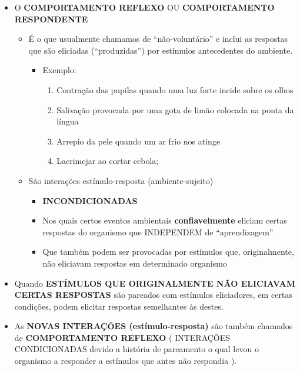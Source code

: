 \documentclass[
]{book}
\providecommand{\tightlist}{%
  \setlength{\itemsep}{0pt}\setlength{\parskip}{0pt}}
\begin{document}
\begin{itemize}
\tightlist
\item
  O \textbf{COMPORTAMENTO REFLEXO} OU \textbf{COMPORTAMENTO RESPONDENTE}

  \begin{itemize}
  \tightlist
  \item
    É o que usualmente chamamos de ``não-voluntário'' e inclui as
    respostas que são eliciadas (``produzidas'') por estímulos
    antecedentes do ambiente.

    \begin{itemize}
    \tightlist
    \item
      Exemplo:

      \begin{enumerate}
      \def\labelenumi{\alph{enumi}.}
      \tightlist
      \item
        Contração das pupilas quando uma luz forte incide sobre os olhos
      \item
        Salivação provocada por uma gota de limão colocada na ponta da
        língua
      \item
        Arrepio da pele quando um ar frio nos atinge
      \item
        Lacrimejar ao cortar cebola;
      \end{enumerate}
    \end{itemize}
  \item
    São interações estímulo-resposta (ambiente-sujeito)

    \begin{itemize}
    \tightlist
    \item
      \textbf{INCONDICIONADAS}
    \item
      Nos quais certos eventos ambientais \textbf{confiavelmente}
      eliciam certas respostas do organismo que INDEPENDEM de
      ``aprendizagem''
    \item
      Que também podem ser provocadas por estímulos que, originalmente,
      não eliciavam respostas em determinado organismo
    \end{itemize}
  \end{itemize}
\item
  Quando \textbf{ESTÍMULOS QUE ORIGINALMENTE NÃO ELICIAVAM CERTAS
  RESPOSTAS} são pareados com estímulos eliciadores, em certas
  condições, podem elicitar respostas semelhantes às destes.
\item
  As \textbf{NOVAS INTERAÇÕES (estímulo-resposta)} são também chamados
  de \textbf{COMPORTAMENTO REFLEXO} ( INTERAÇÕES CONDICIONADAS devido a
  história de pareamento o qual levou o organismo a responder a
  estímulos que antes não respondia ).


\end{itemize}
\end{document}
